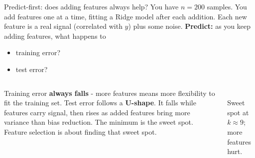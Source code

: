 \documentclass[aspectratio=169]{beamer}
\begin{document}
\begin{frame}{Predict-first: does adding features always help?}
  You have $n = 200$ samples. You add features one at a time, fitting a Ridge model after each addition. Each new feature is a real signal (correlated with $y$) plus some noise.
  \vfill
  \pause
  \textbf{Predict:} as you keep adding features, what happens to
  \begin{itemize}
    \item training error?
    \item test error?
  \end{itemize}
  \pause
  \vfill
  \begin{columns}[T]
    \footnotesize
    Training error \textbf{always falls} - more features means more flexibility to fit the training set.
    \vskip 4pt
    Test error follows a \textbf{U-shape}. It falls while features carry signal, then rises as added features bring more variance than bias reduction. The minimum is the sweet spot.
    \vskip 4pt
    Feature selection is about finding that sweet spot.
    \begin{center}
      \\
      \scriptsize Sweet spot at $k \approx 9$; more features hurt.
    \end{center}
  \end{columns}
\end{frame}
\end{document}
